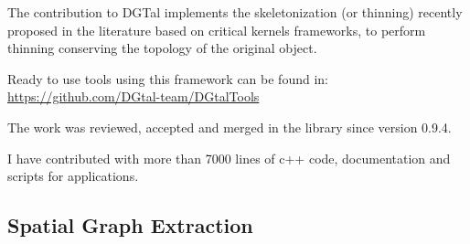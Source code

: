 The contribution to DGTal implements the skeletonization (or thinning) recently proposed in the
literature \cite{couprie_3d_2015, bertrand_parallel_2017} based on critical kernels frameworks, to perform thinning conserving the topology of the original object.

Ready to use tools using this framework can be found in:
\url{https://github.com/DGtal-team/DGtalTools}

The work was reviewed, accepted and merged in the library since version 0.9.4.

I have contributed with more than 7000 lines of c++ code, documentation and scripts for applications.

\subsection{Spatial Graph Extraction}%
\label{sub:spatial_graph_extraction}






